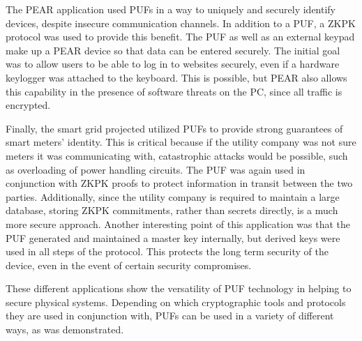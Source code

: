 The PEAR application used PUFs in a way to uniquely and securely identify devices, despite insecure communication
channels. In addition to a PUF, a ZKPK protocol was used to provide this benefit. The PUF as well as an external keypad
make up a PEAR device so that data can be entered securely. The initial goal was to allow users to be able to log in
to websites securely, even if a hardware keylogger was attached to the keyboard. This is possible, but PEAR also
allows this capability in the presence of software threats on the PC, since all traffic is encrypted.

Finally, the smart grid projected utilized PUFs to provide strong guarantees of smart meters' identity. This is critical
because if the utility company was not sure meters it was communicating with, catastrophic attacks would be possible,
such as overloading of power handling circuits. The PUF was again used in conjunction with ZKPK proofs to
protect information in transit between the two parties. Additionally, since the utility company is required to maintain
a large database, storing ZKPK commitments, rather than secrets directly, is a much more secure approach. Another
interesting point of this application was that the PUF generated and maintained a master key internally, 
but derived keys were used in all steps of the protocol. This protects the long term security of the device, even in the 
event of certain security compromises.

These different applications show the versatility of PUF technology in helping to secure physical systems.
Depending on which cryptographic tools and protocols they are used in conjunction with, PUFs can be used
in a variety of different ways, as was demonstrated.